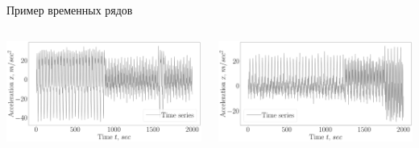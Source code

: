 \documentclass[10pt,pdf,hyperref={unicode}]{beamer}
\begin{document}
\begin{frame}[shrink=5]{Пример временных рядов}

\begin{columns}
    \begin{column}{0.5\textwidth}
        \includegraphics[width=1\textwidth]{results/2_patern_2_series}
    \end{column}
    \begin{column}{0.5\textwidth}
        \includegraphics[width=1\textwidth]{results/3_patern_2_series}
    \end{column}
\end{columns}


\end{frame}
\end{document}
